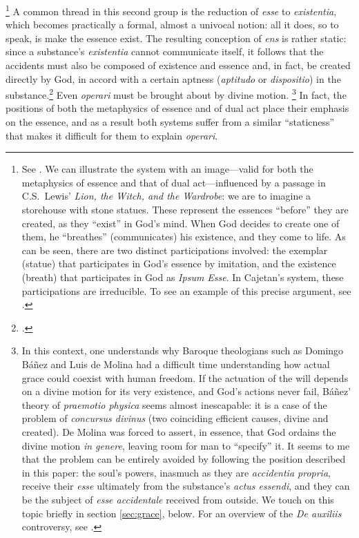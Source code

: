 \footnote{See \cite[274]{gilson:cajetan}. We can illustrate the system with an image—valid for both the metaphysics of essence and that of dual act—influenced by a passage in C.S.~Lewis’ \emph{Lion, the Witch, and the Wardrobe}: we are to imagine a storehouse with stone statues. These represent the essences “before” they are created, as they “exist” in God’s mind. When God decides to create one of them, he “breathes” (communicates) his existence, and they come to life. As can be seen, there are two distinct participations involved: the exemplar (statue) that participates in God’s essence by imitation, and the existence (breath) that participates in God as \emph{Ipsum Esse}. In Cajetan’s system, these participations are irreducible. To see an example of this precise argument, see \cite[36–73]{geiger:participation}.} A common thread in this second group is the reduction of \emph{esse} to \emph{existentia}, which becomes practically a formal, almost a univocal notion: all it does, so to speak, is make the essence exist. The resulting conception of \emph{ens} is rather static: since a substance’s \emph{existentia} cannot communicate itself, it follows that the accidents must also be composed of existence and essence and, in fact, be created directly by God, in accord with a certain aptness (\emph{aptitudo} or \emph{dispositio}) in the substance.\footcite[See][278]{gilson:cajetan} Even \emph{operari} must be brought about by divine motion.%
%
\footnote{In this context, one understands why Baroque theologians such as Domingo Báñez and Luis de Molina had a difficult time understanding how actual grace could coexist with human freedom. If the actuation of the will depends on a divine motion for its very existence, and God’s actions never fail, Báñez’ theory of \emph{praemotio physica} seems almost inescapable: it is a case of the problem of \emph{concursus divinus} (two coinciding efficient causes, divine and created). De Molina was forced to assert, in essence, that God ordains the divine motion \emph{in genere}, leaving room for man to “specify” it. It seems to me that the problem can be entirely avoided by following the position described in this paper: the soul’s powers, inasmuch as they are \emph{accidentia propria}, receive their \emph{esse} ultimately from the substance’s \emph{actus essendi}, and they can be the subject of \emph{esse accidentale} received from outside. We touch on this topic briefly in section \ref{sec:grace}, below. For an overview of the \emph{De auxiliis} controversy, see \cite[342–344]{copleston:history:03}.}
%
In fact, the positions of both the metaphysics of essence and of dual act place their emphasis on the essence, and as a result both systems suffer from a similar “staticness” that makes it difficult for them to explain \emph{operari}.%
